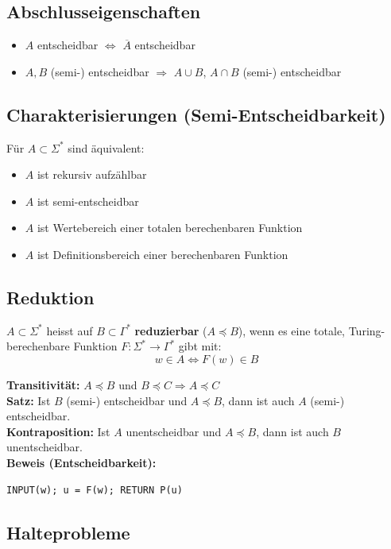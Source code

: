 \subsection{Abschlusseigenschaften}
\begin{itemize}
    \item $A$ entscheidbar $\Leftrightarrow$ $\overline{A}$ entscheidbar
    \item $A, B$ (semi-) entscheidbar $\Rightarrow$ $A \cup B$, $A \cap B$ (semi-) entscheidbar
\end{itemize}

\subsection{Charakterisierungen (Semi-Entscheidbarkeit)}
Für $A \subset \Sigma^*$ sind äquivalent:
\begin{itemize}
    \item $A$ ist rekursiv aufzählbar
    \item $A$ ist semi-entscheidbar
    \item $A$ ist Wertebereich einer totalen berechenbaren Funktion
    \item $A$ ist Definitionsbereich einer berechenbaren Funktion
\end{itemize}

\subsection{Reduktion}
$A \subset \Sigma^*$ heisst auf $B \subset \Gamma^*$ \textbf{reduzierbar} ($A \preceq B$), wenn es eine totale, Turing-berechenbare Funktion $F : \Sigma^* \to \Gamma^*$ gibt mit:
\[
    w \in A \Longleftrightarrow F(w) \in B
\]

\textbf{Transitivität:} $A \preceq B$ und $B \preceq C \Rightarrow A \preceq C$\\
\textbf{Satz:} Ist $B$ (semi-) entscheidbar und $A \preceq B$, dann ist auch $A$ (semi-) entscheidbar.\\
\textbf{Kontraposition:} Ist $A$ unentscheidbar und $A \preceq B$, dann ist auch $B$ unentscheidbar.\\
\textbf{Beweis (Entscheidbarkeit):}
\begin{verbatim}
INPUT(w); u = F(w); RETURN P(u)
\end{verbatim}

\subsection{Halteprobleme}


